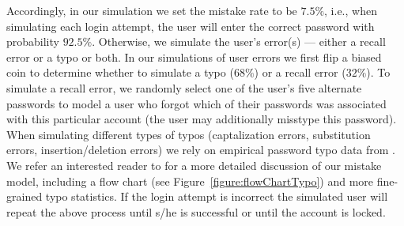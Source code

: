 Accordingly, in our simulation we set the mistake rate to be $7.5\%$, i.e., when simulating each login attempt, the user will enter the correct password with probability $92.5\%$. Otherwise, we simulate the user's error(s) --- either a recall error or a typo or both. In our simulations of user errors we first flip a biased coin to determine whether to simulate a typo ($68\%$) or a recall error ($32\%$). To simulate a recall error, we randomly select one of the user's five alternate passwords to model a user who forgot which of their passwords was associated with this particular account (the user may additionally misstype this password). When simulating different types of typos (captalization errors, substitution errors, insertion/deletion errors) we rely on empirical password typo data from  \cite{SP:CAAJR16,CCS:CWPCR17}.   We refer an interested reader to  for a more detailed discussion of our mistake model, including a flow chart (see Figure~\ref{figure:flowChartTypo}) and more fine-grained typo statistics. If the login attempt is incorrect the simulated user will repeat the above process until s/he is successful or until the account is locked.







